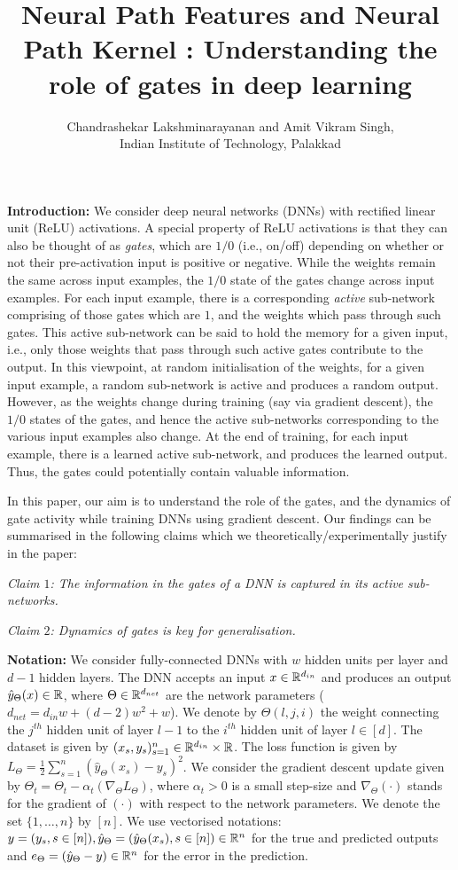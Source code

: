 \documentclass{article}
\title{Neural Path Features and Neural Path Kernel : Understanding the role of gates in deep learning}
\author{Chandrashekar Lakshminarayanan and Amit Vikram Singh, \\ Indian Institute of Technology, Palakkad}
\begin{document}
\maketitle

\textbf{Introduction:} We consider deep neural networks (DNNs) with rectified linear unit (ReLU) activations. A special property of ReLU activations is that they can also be thought of as \emph{gates}, which are $1/0$ (i.e., on/off) depending on whether or not their pre-activation input is positive or negative. While the weights remain the same across input examples, the $1/0$ state of the gates change across input examples. For each input example, there is a corresponding \emph{active} sub-network comprising of those gates which are $1$, and the weights which pass through such gates. This active sub-network can be said to hold the memory for a given input, i.e., only those weights that pass through such active gates contribute to the output. In this viewpoint, at random initialisation of the weights, for a given input example, a random sub-network is active and produces a random output.  However, as the weights change during training (say via gradient descent), the $1/0$ states of the gates, and hence the active sub-networks corresponding to the various input examples also change. At the end of training, for each input example, there is a learned active sub-network, and produces the learned output. Thus, the gates could potentially contain valuable information.

In this paper, our aim is to understand the role of the gates, and the dynamics of gate activity while training DNNs using gradient descent. Our findings can be summarised in the following claims which we theoretically/experimentally justify in the paper:

\emph{Claim $1$: The information in the gates of a DNN is captured in its active sub-networks.}

\emph{Claim $2$: Dynamics of gates is key for generalisation.}

\textbf{Notation:} We consider fully-connected DNNs with $w$ hidden units per layer and $d-1$ hidden layers. The DNN accepts an input $x\in\mathbb{R}^{d_{in}}$ and produces an output $\hat{y}_{\Theta}(x)\in\mathbb{R}$, where $\Theta\in\mathbb{R}^{d_{net}}$ are the network parameters ($d_{net}=d_{in}w+(d-2)w^2+w$). We denote by $\Theta(l,j,i)$ the weight connecting the $j^{th}$ hidden unit of layer $l-1$ to the $i^{th}$ hidden unit of layer $l\in[d]$. The dataset is given by $(x_s,y_s)_{s=1}^n\in\mathbb{R}^{d_{in}}\times \mathbb{R}$. The loss function is given by $L_{\Theta}=\frac{1}{2}\sum_{s=1}^n \left(\hat{y}_{\Theta}(x_s)-y_s\right)^2$. We consider the gradient descent update given by $\Theta_t=\Theta_t-\alpha_t (\nabla_{\Theta} L_{\Theta})$, where $\alpha_t>0$ is a small step-size and $\nabla_{\Theta}(\cdot)$ stands for the gradient of $(\cdot)$ with respect to the network parameters. We denote the set $\{1,\ldots, n\}$ by $[n]$. We use vectorised notations: $y=(y_s,s\in[n]), \hat{y}_{\Theta}=\left(\hat{y}_{\Theta}(x_s), s\in[n]\right)\in\mathbb{R}^n$ for the true and predicted outputs and $e_{\Theta}= (\hat{y}_{\Theta}-y)\in\mathbb{R}^n$ for the error in the prediction.
\end{document}
